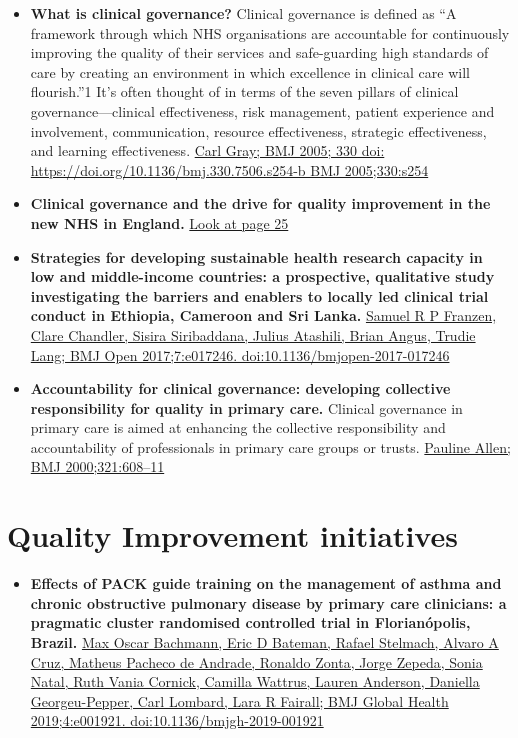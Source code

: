 \documentclass[]{book}
\providecommand{\tightlist}{%
  \setlength{\itemsep}{0pt}\setlength{\parskip}{0pt}}
\begin{document}
\begin{itemize}
\item
  \textbf{What is clinical governance?} Clinical governance is defined as ``A framework through which NHS organisations are accountable for continuously improving the quality of their services and safe-guarding high standards of care by creating an environment in which excellence in clinical care will flourish.''1 It's often thought of in terms of the seven pillars of clinical governance---clinical effectiveness, risk management, patient experience and involvement, communication, resource effectiveness, strategic effectiveness, and learning effectiveness. \href{https://www.bmj.com/content/330/7506/s254.3}{Carl Gray; BMJ 2005; 330 doi: https://doi.org/10.1136/bmj.330.7506.s254-b BMJ 2005;330:s254}
\item
  \textbf{Clinical governance and the drive for quality improvement in the new NHS in England.} \href{https://www.ncbi.nlm.nih.gov/pmc/articles/PMC1113460/pdf/61.pdf}{Look at page 25}
\item
  \textbf{Strategies for developing sustainable health research capacity in low and middle-income countries: a prospective, qualitative study investigating the barriers and enablers to locally led clinical trial conduct in Ethiopia, Cameroon and Sri Lanka.} \href{https://bmjopen.bmj.com/content/bmjopen/7/10/e017246.full.pdf}{Samuel R P Franzen, Clare Chandler, Sisira Siribaddana, Julius Atashili, Brian Angus, Trudie Lang; BMJ Open 2017;7:e017246. doi:10.1136/bmjopen-2017-017246}
\item
  \textbf{Accountability for clinical governance: developing collective responsibility for quality in primary care.} Clinical governance in primary care is aimed at enhancing the collective responsibility and accountability of professionals in primary care groups or trusts. \href{https://www.who.int/management/partnerships/accountability/ClinicalGovernancePHCAccountability.pdf}{Pauline Allen; BMJ 2000;321:608--11}
\end{itemize}

\hypertarget{quality-improvement-initiatives}{%
\section*{Quality Improvement initiatives}\label{quality-improvement-initiatives}}

\begin{itemize}
\tightlist
\item
  \textbf{Effects of PACK guide training on the management of asthma and chronic obstructive pulmonary disease by primary care clinicians: a pragmatic cluster randomised controlled trial in Florianópolis, Brazil.} \href{file:///C:/Users/Adelson/Downloads/e001921.full.pdf}{Max Oscar Bachmann, Eric D Bateman, Rafael Stelmach, Alvaro A Cruz, Matheus Pacheco de Andrade, Ronaldo Zonta, Jorge Zepeda, Sonia Natal, Ruth Vania Cornick, Camilla Wattrus, Lauren Anderson, Daniella Georgeu-Pepper, Carl Lombard, Lara R Fairall; BMJ Global Health 2019;4:e001921. doi:10.1136/bmjgh-2019-001921}
\end{itemize}
\end{document}
